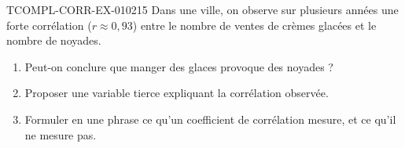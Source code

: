 \begin{exercice}{TCOMPL-CORR-EX-010}{2}{15}
Dans une ville, on observe sur plusieurs années une forte corrélation
($r\approx0{,}93$) entre le nombre de ventes de crèmes glacées et le nombre
de noyades.
\begin{enumerate}
  \item Peut-on conclure que manger des glaces provoque des noyades ?
  \item Proposer une variable tierce expliquant la corrélation observée.
  \item Formuler en une phrase ce qu'un coefficient de corrélation mesure, et
        ce qu'il ne mesure pas.
\end{enumerate}
\end{exercice}
